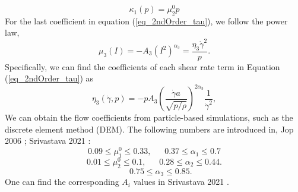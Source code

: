 \begin{equation}
    \kappa_1(p) = \mu_2^0 p
\label{eq_kappa2}
\end{equation}
For the last coefficient in equation (\ref{eq_2ndOrder_tau}), we follow the power law, 
\begin{equation}
    \mu_3(I) = -A_3 \left( I^2 \right)^{\alpha_3} = \frac{\eta_3 \dot{\gamma}^2}{p}.
\label{eq_muI3}
\end{equation}
Specifically, we can find the coefficients of each shear rate term in Equation (\ref{eq_2ndOrder_tau}) as
\begin{equation}
     \eta_3 (\dot{\gamma}, p) = 
    -p A_3 
        \left( \frac{\dot{\gamma} a }{\sqrt{p/\rho}}  \right)^{2\alpha_3} 
        \frac{1}{\dot{\gamma}^2},
\label{eq_gr_eta_3}
\end{equation}
We can obtain the flow coefficients from particle-based simulations, such as the discrete element method (DEM). The following numbers are introduced in, Jop 2006 \cite{jop_constitutive_2006}; Srivastava 2021 \cite{srivastava_viscometric_2021}:
    \[
    0.09 \leq \mu_1^0 \leq 0.33, 
    \ \ \ \ \ \ \ 
    0.37 \leq \alpha_1 \leq 0.7
    \]
        \[
    0.01 \leq \mu_2^0 \leq 0.1, 
    \ \ \ \ \ \ \ 
    0.28 \leq \alpha_2 \leq 0.44.
    \]
            \[
    \ \ \ \ \ \ \ 
    0.75 \leq \alpha_3 \leq 0.85.
    \]
     One can find the corresponding $A_i$ values in Srivastava 2021 \cite{srivastava_viscometric_2021}.
